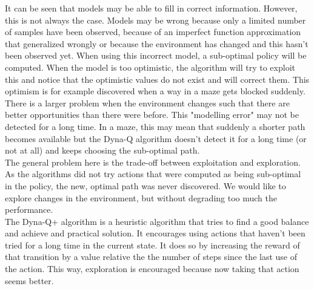 \documentclass[a4paper]{article}
\begin{document}
It can be seen that models may be able to fill in correct information. However, this is not always the case. Models may be wrong because only a limited number of samples have been observed, because of an imperfect function approximation that generalized wrongly or because the environment has changed and this hasn't been observed yet. When using this incorrect model, a sub-optimal policy will be computed. When the model is too optimistic, the algorithm will try to exploit this and notice that the optimistic values do not exist and will correct them. This optimism is for example discovered when a way in a maze gets blocked suddenly.\\
There is a larger problem when the environment changes such that there are better opportunities than there were before. This "modelling error" may not be detected for a long time. In a maze, this may mean that suddenly a shorter path becomes available but the Dyna-Q algorithm doesn't detect it for a long time (or not at all) and keeps choosing the sub-optimal path.\\
The general problem here is the trade-off between exploitation and exploration. As the algorithms did not try actions that were computed as being sub-optimal in the policy, the new, optimal path was never discovered. We would like to explore changes in the environment, but without degrading too much the performance.\\
The Dyna-Q+ algorithm is a heuristic algorithm that tries to find a good balance and achieve and practical solution. It encourages using actions that haven't been tried for a long time in the current state. It does so by increasing the reward of that transition by a value relative the the number of steps since the last use of the action. This way, exploration is encouraged because now taking that action seems better.\\
\end{document}
